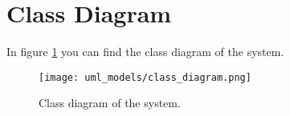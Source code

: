 \section{Class Diagram}
In figure \ref{fig:class_diagram} you can find the class diagram of the system.

\begin{figure}
	\centering
	\texttt{[image: uml\_models/class\_diagram.png]}
	\caption{Class diagram of the system.}
	\label{fig:class_diagram}
\end{figure}